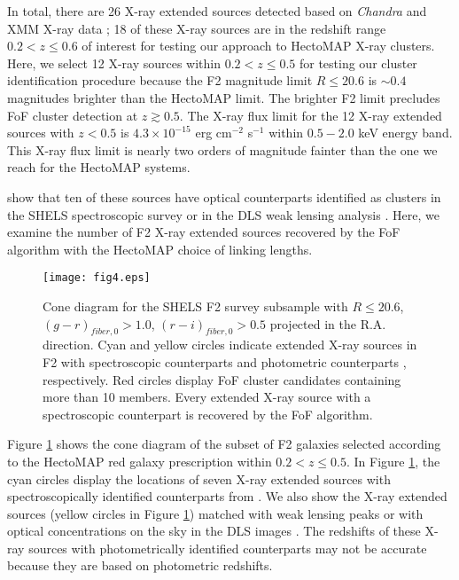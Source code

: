 \documentclass[iop, apj]{emulateapj}
\begin{document}
In total, there are 26 X-ray extended sources detected
 based on {\it Chandra} and XMM X-ray data \citep{Starikova14};
 18 of these X-ray sources are in the redshift range $0.2 < z \leq 0.6$ of interest 
 for testing our approach to HectoMAP X-ray clusters. 
Here, we select 12 X-ray sources within $0.2 < z \leq 0.5$ 
 for testing our cluster identification procedure
 because the F2 magnitude limit $R \leq 20.6$ is $\sim0.4$ magnitudes brighter than the HectoMAP limit. 
The brighter F2 limit precludes FoF cluster detection at $z \gtrsim 0.5$.
The X-ray flux limit for the 12 X-ray extended sources with $z < 0.5$ 
 is $4.3 \times 10^{-15}$ erg cm$^{-2}$ s$^{-1}$
 within $0.5 - 2.0$ keV energy band. 
This X-ray flux limit is nearly two orders of magnitude fainter 
 than the one we reach for the HectoMAP systems. 

\citet{Starikova14} show that ten of these sources have 
 optical counterparts identified as clusters 
 in the SHELS spectroscopic survey \citep{Geller10} or in the DLS weak lensing analysis \citep{Wittman06}. 
Here, we examine the number of F2 X-ray extended sources 
 recovered by the FoF algorithm with the HectoMAP choice of linking lengths. 

\begin{figure}
\centering
\texttt{[image: fig4.eps]}
\caption{
Cone diagram for the SHELS F2 survey subsample 
 with $R \leq 20.6$, $(g-r)_{fiber,0} > 1.0$, $(r-i)_{fiber, 0} > 0.5$
 projected in the R.A. direction. 
Cyan and yellow circles indicate
 extended X-ray sources in F2
 with spectroscopic counterparts \citep{Geller10} and 
 photometric counterparts \citep{Wittman06, Starikova14}, respectively. 
Red circles display FoF cluster candidates containing more than 10 members. 
Every extended X-ray source with a spectroscopic counterpart is recovered by the FoF algorithm.}
\label{f2cone}
\end{figure}

Figure \ref{f2cone} shows the cone diagram of 
 the subset of F2 galaxies selected according to the HectoMAP red galaxy prescription
 within $0.2 < z \leq 0.5$.
In Figure \ref{f2cone}, 
 the cyan circles display the locations of seven X-ray extended sources 
 with spectroscopically identified counterparts from \citet{Geller10}. 
We also show the X-ray extended sources (yellow circles in Figure \ref{f2cone})
 matched with weak lensing peaks \citep{Wittman06}
 or with optical concentrations on the sky in the DLS images \citep{Starikova14}. 
The redshifts of these X-ray sources with photometrically identified counterparts
 may not be accurate because they are based on photometric redshifts. 
  
\end{document}
